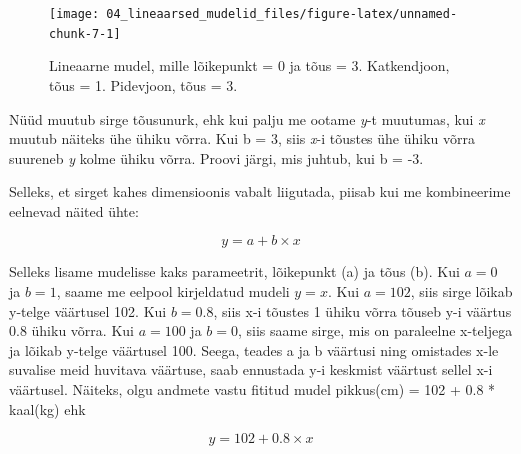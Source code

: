 \documentclass[]{book}
\newenvironment{Shaded}{\begin{snugshade}}{\end{snugshade}}
\newcommand{\DataTypeTok}[1]{\textcolor[rgb]{0.13,0.29,0.53}{#1}}
\newcommand{\DecValTok}[1]{\textcolor[rgb]{0.00,0.00,0.81}{#1}}
\newcommand{\KeywordTok}[1]{\textcolor[rgb]{0.13,0.29,0.53}{\textbf{#1}}}
\newcommand{\NormalTok}[1]{#1}
\newcommand{\OperatorTok}[1]{\textcolor[rgb]{0.81,0.36,0.00}{\textbf{#1}}}
\newcommand{\StringTok}[1]{\textcolor[rgb]{0.31,0.60,0.02}{#1}}
\begin{document}
\begin{Shaded}
\end{Shaded}

\begin{figure}

{\centering \texttt{[image: 04\_lineaarsed\_mudelid\_files/figure-latex/unnamed-chunk-7-1]} 

}

\caption{Lineaarne mudel, mille lõikepunkt = 0 ja tõus = 3. Katkendjoon, tõus = 1. Pidevjoon, tõus = 3.}\label{fig:unnamed-chunk-7}
\end{figure}

Nüüd muutub sirge tõusunurk, ehk kui palju me ootame \emph{y}-t muutumas, kui \emph{x} muutub näiteks ühe ühiku võrra.
Kui b = 3, siis \emph{x}-i tõustes ühe ühiku võrra suureneb \emph{y} kolme ühiku võrra. Proovi järgi, mis juhtub, kui b = -3.

Selleks, et sirget kahes dimensioonis vabalt liigutada, piisab kui me kombineerime eelnevad näited ühte:

\[y = a + b \times x\]

Selleks lisame mudelisse kaks parameetrit, lõikepunkt (a) ja tõus (b).
Kui \(a = 0\) ja \(b = 1\), saame me eelpool kirjeldatud mudeli \(y = x\).
Kui \(a = 102\), siis sirge lõikab y-telge väärtusel 102.
Kui \(b = 0.8\), siis x-i tõustes 1 ühiku võrra tõuseb y-i väärtus 0.8 ühiku võrra.
Kui \(a = 100\) ja \(b = 0\), siis saame sirge, mis on paraleelne x-teljega ja lõikab y-telge väärtusel 100.
Seega, teades a ja b väärtusi ning omistades x-le suvalise meid huvitava väärtuse, saab ennustada y-i keskmist väärtust sellel x-i väärtusel.
Näiteks, olgu andmete vastu fititud mudel pikkus(cm) = 102 + 0.8 * kaal(kg) ehk

\[y = 102 + 0.8 \times x\]
\end{document}
